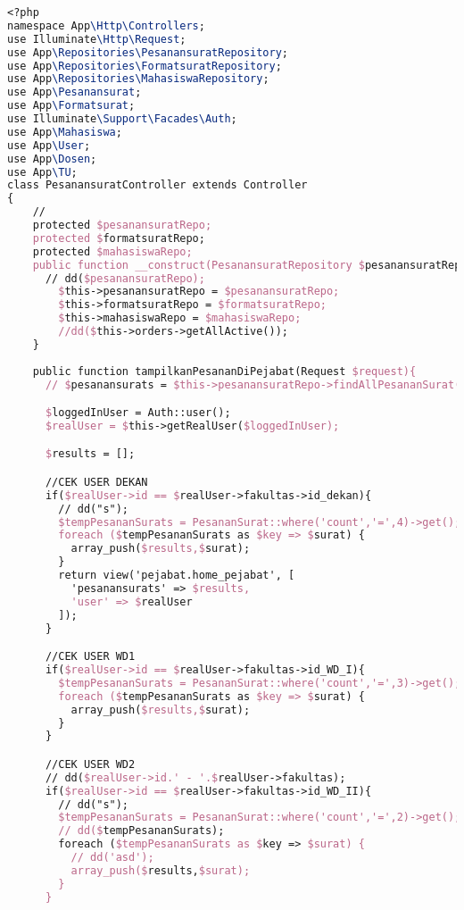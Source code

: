 \begin{lstlisting}[language=tex,basicstyle=\tiny,caption=PesanansuratController.php]
<?php
namespace App\Http\Controllers;
use Illuminate\Http\Request;
use App\Repositories\PesanansuratRepository;
use App\Repositories\FormatsuratRepository;
use App\Repositories\MahasiswaRepository;
use App\Pesanansurat;
use App\Formatsurat;
use Illuminate\Support\Facades\Auth;
use App\Mahasiswa;
use App\User;
use App\Dosen;
use App\TU;
class PesanansuratController extends Controller
{
    //
    protected $pesanansuratRepo;
    protected $formatsuratRepo;
    protected $mahasiswaRepo;
    public function __construct(PesanansuratRepository $pesanansuratRepo, FormatsuratRepository $formatsuratRepo, MahasiswaRepository $mahasiswaRepo){
      // dd($pesanansuratRepo);
        $this->pesanansuratRepo = $pesanansuratRepo;
        $this->formatsuratRepo = $formatsuratRepo;
        $this->mahasiswaRepo = $mahasiswaRepo;
        //dd($this->orders->getAllActive());
    }
    
    public function tampilkanPesananDiPejabat(Request $request){
      // $pesanansurats = $this->pesanansuratRepo->findAllPesananSurat();

      $loggedInUser = Auth::user();
      $realUser = $this->getRealUser($loggedInUser);

      $results = [];

      //CEK USER DEKAN
      if($realUser->id == $realUser->fakultas->id_dekan){
        // dd("s");
        $tempPesananSurats = PesananSurat::where('count','=',4)->get();
        foreach ($tempPesananSurats as $key => $surat) {
          array_push($results,$surat);
        }
        return view('pejabat.home_pejabat', [
          'pesanansurats' => $results,
          'user' => $realUser
        ]);
      }

      //CEK USER WD1
      if($realUser->id == $realUser->fakultas->id_WD_I){
        $tempPesananSurats = PesananSurat::where('count','=',3)->get();
        foreach ($tempPesananSurats as $key => $surat) {
          array_push($results,$surat);
        }
      }

      //CEK USER WD2
      // dd($realUser->id.' - '.$realUser->fakultas);
      if($realUser->id == $realUser->fakultas->id_WD_II){
        // dd("s");
        $tempPesananSurats = PesananSurat::where('count','=',2)->get();
        // dd($tempPesananSurats);
        foreach ($tempPesananSurats as $key => $surat) {
          // dd('asd');
          array_push($results,$surat);
        }
      }


\end{lstlisting}
